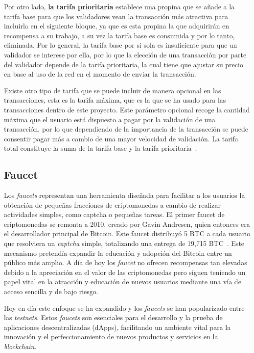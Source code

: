 Por otro lado, \textbf{la tarifa prioritaria} establece una propina que se añade a la tarifa base para que los validadores vean la transacción más atractiva para incluirla en el siguiente bloque, ya que es esta propina la que adquirirán en recompensa a su trabajo, a su vez la tarifa base es consumida y por lo tanto, eliminada.
Por lo general, la tarifa base por si sola es insuficiente para que un validador se interese por ella, por lo que la elección de una transacción por parte del validador depende de la tarifa prioritaria, la cual tiene que ajustar su precio en base al uso de la red en el momento de enviar la transacción.

Existe otro tipo de tarifa que se puede incluir de manera opcional en las transacciones, esta es la tarifa máxima, que es la que se ha usado para las transacciones dentro de este proyecto.
Este parámetro opcional recoge la cantidad máxima que el usuario está dispuesto a pagar por la validación de una transacción, por lo que dependiendo de la importancia de la transacción se puede consentir pagar más a cambio de una mayor velocidad de validación.
La tarifa total constituye la suma de la tarifa base y la tarifa prioritaria~\cite{gasEthereum}.


\subsection{Faucet}

Los \textit{faucets} representan una herramienta diseñada para facilitar a los usuarios la obtención de pequeñas fracciones de criptomonedas a cambio de realizar actividades simples, como captcha o pequeñas tareas.
El primer faucet de criptomonedas se remonta a 2010, creado por Gavin Andresen, quien entonces era el desarrollador principal de Bitcoin. Este faucet distribuyó 5 BTC a cada usuario que resolviera un \textit{captcha} simple, totalizando una entrega de 19,715 BTC~\cite{faucet}. 
Este mecanismo pretendía expandir la educación y adopción del Bitcoin entre un público más amplio.
A día de hoy los \textit{faucet} no ofrecen recompensas tan elevadas debido a la apreciación en el valor de las criptomonedas pero siguen teniendo un papel vital en la atracción y educación de nuevos usuarios mediante una vía de acceso sencilla y de bajo riesgo.

Hoy en día este enfoque se ha expandido y los \textit{faucets} se han popularizado entre las \textit{testnets}. Estos \textit{faucets} son esenciales para el desarrollo y la prueba de aplicaciones descentralizadas (dApps), facilitando un ambiente vital para la innovación y el perfeccionamiento de nuevos productos y servicios en la \textit{blockchain}.



